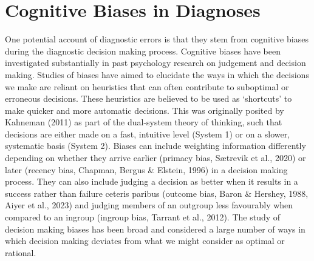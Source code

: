 \documentclass[a4paper, nobind]{templates/ociamthesis}
\begin{document}
\section*{Cognitive Biases in Diagnoses}\label{cognitive-biases-in-diagnoses}

One potential account of diagnostic errors is that they stem from cognitive biases during the diagnostic decision making process. Cognitive biases have been investigated substantially in past psychology research on judgement and decision making. Studies of biases have aimed to elucidate the ways in which the decisions we make are reliant on heuristics that can often contribute to suboptimal or erroneous decisions. These heuristics are believed to be used as `shortcuts' to make quicker and more automatic decisions. This was originally posited by Kahneman (2011) as part of the dual-system theory of thinking, such that decisions are either made on a fast, intuitive level (System 1) or on a slower, systematic basis (System 2). Biases can include weighting information differently depending on whether they arrive earlier (primacy bias, Sætrevik et al., 2020) or later (recency bias, Chapman, Bergus \& Elstein, 1996) in a decision making process. They can also include judging a decision as better when it results in a success rather than failure ceteris paribus (outcome bias, Baron \& Hershey, 1988, Aiyer et al., 2023) and judging members of an outgroup less favourably when compared to an ingroup (ingroup bias, Tarrant et al., 2012). The study of decision making biases has been broad and considered a large number of ways in which decision making deviates from what we might consider as optimal or rational.
\end{document}
